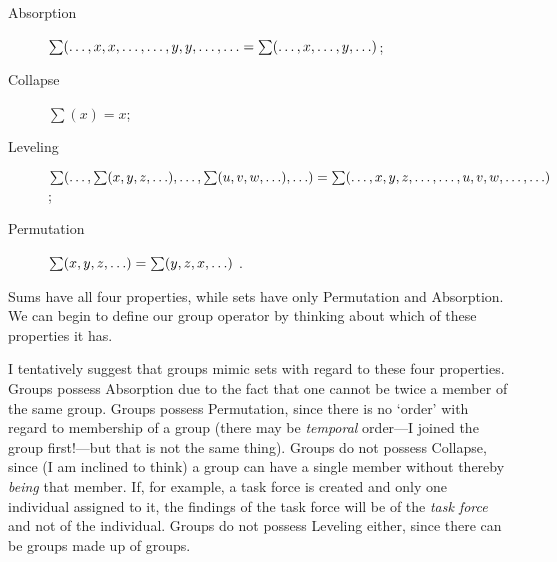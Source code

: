 \documentclass[11pt]{article}
\begin{document}
\begin{spacing}{1.5}
\begin{description}
  \item[Absorption] $\sum (\mathellipsis, x, x, \mathellipsis,
    \mathellipsis, y, y, \mathellipsis, \mathellipsis = \sum (
    \mathellipsis, x, \mathellipsis, y, \mathellipsis )$;
\item[Collapse] $\sum (x) = x$;
\item[Leveling] $\sum (\mathellipsis, \sum (x, y, z, \mathellipsis ),
  \mathellipsis, \sum (u, v, w, \mathellipsis ), \mathellipsis ) \\ =
  \sum (\mathellipsis, x, y, z, \mathellipsis, \mathellipsis, u, v, w,
  \mathellipsis, \mathellipsis )$;
\item[Permutation] $\sum (x, y, z, \mathellipsis ) = \sum (y, z, x,
  \mathellipsis )$ \citep[573]{fine2010}.
\end{description}

Sums have all four properties, while sets have only Permutation and
Absorption.  We can begin to define our group operator by thinking
about which of these properties it has.

I tentatively suggest that groups mimic sets with regard to these
four properties.  Groups possess Absorption due to the fact that one
cannot be twice a member of the same group.  Groups possess
Permutation, since there is no `order' with regard to membership of a
group (there may be {\em temporal} order---I joined the group
first!---but that is not the same thing).  Groups do not possess
Collapse, since (I am inclined to think) a group can have a single
member without thereby {\em being} that member.  If, for example, a
task force is created and only one individual assigned to it, the
findings of the task force will be of the {\em task force} and not of
the individual.  Groups do not possess Leveling either, since there
can be groups made up of groups.




\end{spacing}
\end{document}
